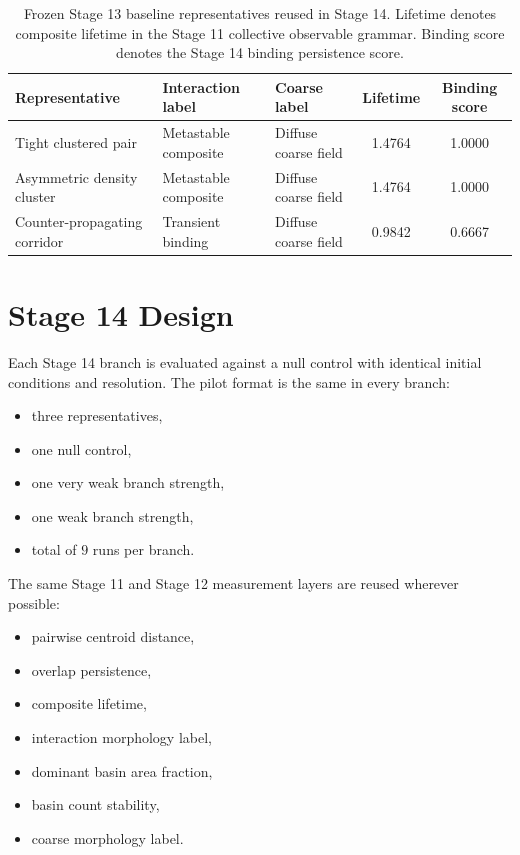 \documentclass[11pt]{article}
\begin{document}
\begin{table}[h]
\centering
\small
\begin{tabular}{p{}p{}p{}cc}
\toprule
Representative & Interaction label & Coarse label & Lifetime & Binding score \\
\midrule
Tight clustered pair & Metastable composite & Diffuse coarse field & 1.4764 & 1.0000 \\
Asymmetric density cluster & Metastable composite & Diffuse coarse field & 1.4764 & 1.0000 \\
Counter-propagating corridor & Transient binding & Diffuse coarse field & 0.9842 & 0.6667 \\
\bottomrule
\end{tabular}
\caption{Frozen Stage 13 baseline representatives reused in Stage 14. Lifetime denotes composite lifetime in the Stage 11 collective observable grammar. Binding score denotes the Stage 14 binding persistence score.}
\label{tab:baseline}
\end{table}

\section{Stage 14 Design}

Each Stage 14 branch is evaluated against a null control with identical initial conditions and resolution. The pilot format is the same in every branch:
\begin{itemize}
\item three representatives,
\item one null control,
\item one very weak branch strength,
\item one weak branch strength,
\item total of $9$ runs per branch.
\end{itemize}

The same Stage 11 and Stage 12 measurement layers are reused wherever possible:
\begin{itemize}
\item pairwise centroid distance,
\item overlap persistence,
\item composite lifetime,
\item interaction morphology label,
\item dominant basin area fraction,
\item basin count stability,
\item coarse morphology label.
\end{itemize}
\end{document}
